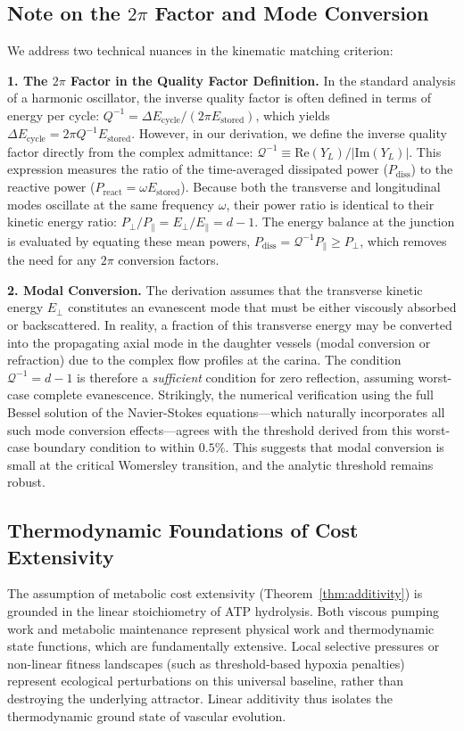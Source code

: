 \documentclass[11pt,a4paper]{article}
\theoremstyle{remark}
\begin{document}
\subsection{Note on the $2\pi$ Factor and Mode Conversion}

We address two technical nuances in the kinematic matching criterion:

\textbf{1. The $2\pi$ Factor in the Quality Factor Definition.} In the standard
analysis of a harmonic oscillator, the inverse quality factor is often defined
in terms of energy per cycle: $Q^{-1} = \Delta E_{\text{cycle}} / (2\pi
E_{\text{stored}})$, which yields $\Delta E_{\text{cycle}} = 2\pi Q^{-1}
E_{\text{stored}}$. However, in our derivation, we define the inverse quality
factor directly from the complex admittance: $\mathcal{Q}^{-1} \equiv
\mathrm{Re}(Y_L)/|\mathrm{Im}(Y_L)|$. This expression measures the ratio of the
time-averaged dissipated power ($P_{\mathrm{diss}}$) to the reactive power
($P_{\mathrm{react}} = \omega E_{\text{stored}}$). Because both the transverse
and longitudinal modes oscillate at the same frequency $\omega$, their power
ratio is identical to their kinetic energy ratio: $P_\perp / P_\parallel =
E_\perp / E_\parallel = d-1$. The energy balance at the junction is evaluated by
equating these mean powers, $P_{\mathrm{diss}} = \mathcal{Q}^{-1} P_\parallel
\ge P_\perp$, which removes the need for any $2\pi$ conversion factors.

\textbf{2. Modal Conversion.} The derivation assumes that the transverse kinetic
energy $E_\perp$ constitutes an evanescent mode that must be either viscously
absorbed or backscattered. In reality, a fraction of this transverse energy may
be converted into the propagating axial mode in the daughter vessels (modal
conversion or refraction) due to the complex flow profiles at the carina. The
condition $\mathcal{Q}^{-1} = d-1$ is therefore a \emph{sufficient} condition
for zero reflection, assuming worst-case complete evanescence. Strikingly, the
numerical verification using the full Bessel solution of the Navier-Stokes
equations---which naturally incorporates all such mode conversion
effects---agrees with the threshold derived from this worst-case boundary
condition to within $0.5\%$. This suggests that modal conversion is small
at the critical Womersley transition, and the analytic threshold remains robust.

\subsection{Thermodynamic Foundations of Cost Extensivity}
The assumption of metabolic cost extensivity (Theorem~\ref{thm:additivity}) is
grounded in the linear stoichiometry of ATP hydrolysis. Both viscous pumping
work and metabolic maintenance represent physical work and thermodynamic state
functions, which are fundamentally extensive. Local selective pressures or
non-linear fitness landscapes (such as threshold-based hypoxia penalties)
represent ecological perturbations on this universal baseline, rather than
destroying the underlying attractor. Linear additivity thus isolates the
thermodynamic ground state of vascular evolution.
\end{document}
